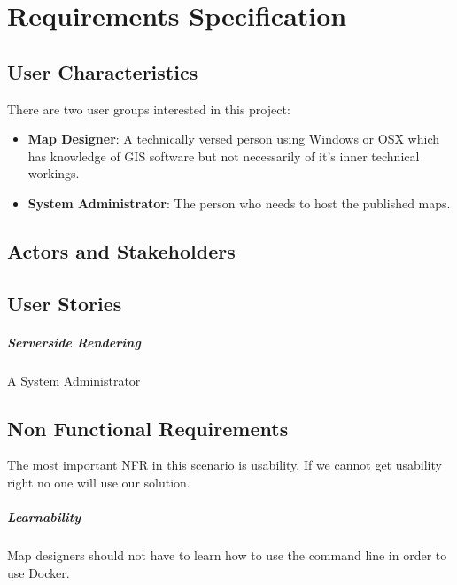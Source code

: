 \chapter{Requirements Specification}
\label{requirements-specification}

\section{User Characteristics}
\label{user-characteristics}

There are two user groups interested in this project:

\begin{itemize}
\item
  \textbf{Map Designer}: A technically versed person using Windows or
  OSX which has knowledge of GIS software but not necessarily of it's
  inner technical workings.
\item
  \textbf{System Administrator}: The person who needs to host the
  published maps.
\end{itemize}

\section{Actors and Stakeholders}
\label{actors-and-stakeholders}

\section{User Stories}
\label{user-stories}
\paragraph{Serverside Rendering}
A System Administrator 

\section{Non Functional Requirements}
\label{non-functional-requirements}

The most important NFR in this scenario is usability. If we cannot get
usability right no one will use our solution.

\paragraph{Learnability}

Map designers should not have to learn how to use the command line in
order to use Docker.

